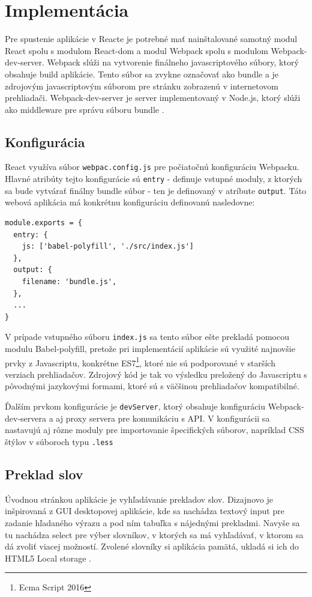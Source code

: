 \documentclass[
  digital, %
  table,   %
  lof,     %
  lot,     %
]{fithesis3}
\begin{document}
\section{Implementácia}
Pre spustenie aplikácie v Reacte je potrebné mať nainštalované samotný modul React spolu s modulom React-dom a modul Webpack spolu s modulom Webpack-dev-server. Webpack slúži na vytvorenie finálneho javascriptového súbory, ktorý obsahuje build aplikácie. Tento súbor sa zvykne označovať ako bundle a je zdrojovým javascriptovým súborom pre stránku zobrazenú v internetovom prehliadači. Webpack-dev-server je server implementovaný v Node.js, ktorý slúži ako middleware pre správu súboru bundle \parencite{webpack}.

\subsection{Konfigurácia}
React využíva súbor \texttt{webpac.config.js} pre počiatočnú konfiguráciu Webpacku. Hlavné atribúty tejto konfigurácie sú \texttt{entry} - definuje vstupné moduly, z ktorých sa bude vytvárať finálny bundle súbor - ten je definovaný v atríbute \texttt{output}. Táto webová aplikácia má konkrétnu konfiguráciu definovanú nasledovne:

\begin{lstlisting}[basicstyle=\small]
module.exports = {  
  entry: {
    js: ['babel-polyfill', './src/index.js']
  },
  output: {
    filename: 'bundle.js',
  },
  ...
}
\end{lstlisting}

V prípade vstupného súboru \texttt{index.js} sa tento súbor ešte prekladá pomocou modulu Babel-polyfill, pretože pri implementácií aplikácie sú využité najnovšie prvky z Javascriptu, konkrétne ES7\footnote{Ecma Script 2016}, ktoré nie sú podporované v starších verziach prehliadačov. Zdrojový kód je tak vo výsledku preložený do Javascriptu s pôvodnými jazykovými formami, ktoré sú s väčšinou prehliadačov kompatibilné.

Ďalším prvkom konfigurácie je \texttt{devServer}, ktorý obsahuje konfiguráciu Webpack-dev-servera a aj proxy servera pre komunikáciu s API. V konfigurácii sa nastavujú aj rôzne moduly pre importovanie špecifických súborov, napríklad CSS štýlov v súboroch typu \texttt{.less}

\subsection{Preklad slov}
Úvodnou stránkou aplikácie je vyhľadávanie prekladov slov. Dizajnovo je inšpirovaná z GUI desktopovej aplikácie, kde sa nachádza textový input pre zadanie hľadaného výrazu a pod ním tabuľka s nájednými prekladmi. Navyše sa tu nachádza select pre výber slovníkov, v ktorých sa má vyhľadávať, v ktorom sa dá zvoliť viacej možností. Zvolené slovníky si aplikácia pamätá, ukladá si ich do HTML5 Local storage \parencite{webstorage}.
\end{document}
